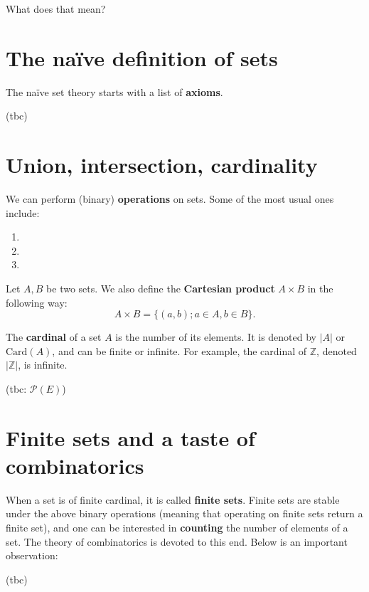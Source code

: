 \documentclass[
	fontsize=10pt, %
	twoside=true, %
	secnumdepth=1, %
	numbers=noenddot, %
]{kaobook}
\begin{document}
What does that mean?

\section{The naïve definition of sets}
The naïve set theory starts with a list of \textbf{axioms}.

(tbc)

\section{Union, intersection, cardinality}
We can perform (binary) \textbf{operations} on sets. Some of the most usual ones include:
\begin{enumerate}
	\item
	\item
	\item
\end{enumerate}

Let $A,B$ be two sets. We also define the \textbf{Cartesian product} $A\times B$ in the following way:
\begin{equation*}
A\times B=\{(a,b);a\in A, b\in B\}.
\end{equation*}

The \textbf{cardinal} of a set $A$ is the number of its elements. It is denoted by $|A|$ or $\text{Card}(A)$, and can be finite or infinite. For example, the cardinal of $\mathbb{Z}$, denoted $|\mathbb{Z}|$, is infinite.

(tbc: $\mathcal{P}(E)$)

\section{Finite sets and a taste of combinatorics}
When a set is of finite cardinal, it is called \textbf{finite sets}. Finite sets are stable under the above binary operations (meaning that operating on finite sets return a finite set), and one can be interested in \textbf{counting} the number of elements of a set. The theory of combinatorics is devoted to this end. Below is an important observation:
\begin{theorem}
(tbc)
\end{theorem}
\end{document}
